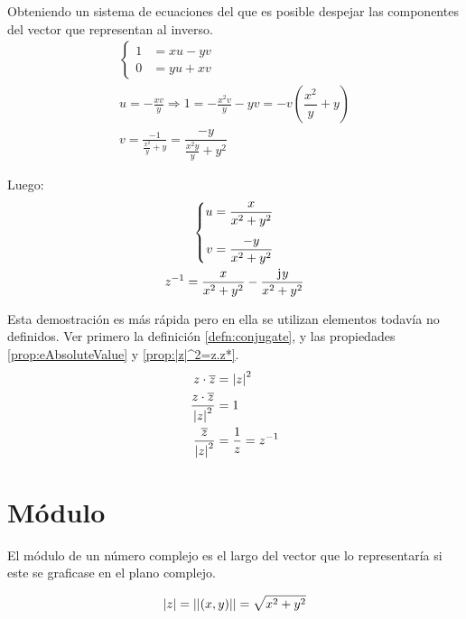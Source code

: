 Obteniendo un sistema de ecuaciones del que es posible despejar las componentes del vector que representan al inverso.
\begin{gather*}
    \left\{
    \begin{aligned}
        1 &= xu-yv
        \\
        0 &= yu+xv
    \end{aligned}
    \right.
    \\
    u = -\frac{xv}{y} \Rightarrow 1= -\frac{x^2v}{y}-yv = -v\left( \dfrac{x^2}{y}+y \right)
    \\
    v=\frac{-1}{\frac{x^2}{y}+y}=\dfrac{-y}{\frac{x^2y}{y}+y^2}
\end{gather*}

Luego:
\begin{gather*}
    \left\{
    \begin{aligned}
        u &= \frac{x}{x^2+y^2}
        \\[1ex]
        v &= \frac{-y}{x^2+y^2}
    \end{aligned}
    \right.
    \\
    z^{-1} = \dfrac{x}{x^2+y^2}-\dfrac{\mkern2mu\mathrm{j}\mkern1mu y}{x^2+y^2}
\end{gather*}


Esta demostración es más rápida pero en ella se utilizan elementos todavía no definidos.
Ver primero la definición \ref{defn:conjugate}, y las propiedades \ref{prop:eAbsoluteValue} y \ref{prop:|z|^2=z.z*}.
\begin{align*}
    z \cdot \overline{z} &= {\left| {z} \right|}^2
    \\
    \frac{z \cdot \overline{z}}{{\left| {z} \right|}^2} &= 1
    \\
    \frac{\overline{z}}{{\left| {z} \right|}^2} &= \dfrac{1}{z}=z^{-1}
\end{align*}


\section{Módulo}

El módulo de un número complejo es el largo del vector que lo representaría si este se graficase en el plano complejo.

\begin{mdframed}[style=DefinitionFrame]
    \begin{defn}
    \end{defn}
    \begin{equation*}
        {\left| {z} \right|} = {\left|\left| {(x,y)} \right|\right|} = \sqrt{x^2+y^2}
    \end{equation*}
\end{mdframed}

